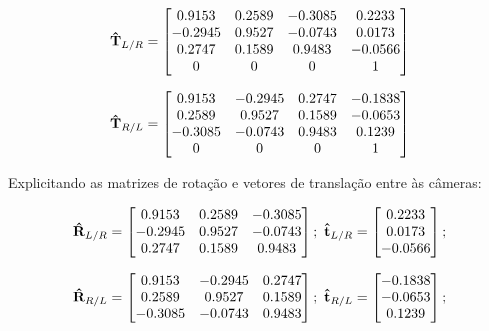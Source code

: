 \begin{equation}\label{eq:tfL2R}
	\mathbf{\hat{T}}_{L/R} = \begin{bmatrix}
		0.9153  & 0.2589 & -0.3085 & 0.2233  \\
		-0.2945 & 0.9527 & -0.0743 & 0.0173  \\
		0.2747  & 0.1589 & 0.9483  & -0.0566 \\
		0       & 0      & 0       & 1   
	\end{bmatrix}
\end{equation}

\begin{equation}\label{eq:tfR2L}
	\mathbf{\hat{T}}_{R/L} = \begin{bmatrix}
		0.9153  & -0.2945 & 0.2747 & -0.1838 \\
		0.2589  & 0.9527  & 0.1589 & -0.0653 \\
		-0.3085 & -0.0743 & 0.9483 & 0.1239  \\
		0       & 0       & 0      & 1
	\end{bmatrix}
\end{equation}

Explicitando as matrizes de rotação e vetores de translação entre às câmeras:

\begin{gather}
	\mathbf{\hat{R}}_{L/R} = \begin{bmatrix}
		0.9153  & 0.2589 & -0.3085 \\
		-0.2945 & 0.9527 & -0.0743 \\
		0.2747  & 0.1589 & 0.9483 
	\end{bmatrix}; \ \mathbf{\hat{t}}_{L/R} = \begin{bmatrix}
		0.2233 \\
		0.0173 \\
		-0.0566
	\end{bmatrix};
\end{gather}

\begin{gather}
\mathbf{\hat{R}}_{R/L} = \begin{bmatrix}
	0.9153  & -0.2945 & 0.2747 \\
	0.2589  & 0.9527  & 0.1589 \\
	-0.3085 & -0.0743 & 0.9483
\end{bmatrix}; \ \mathbf{\hat{t}}_{R/L} = \begin{bmatrix}
	-0.1838 \\
	-0.0653 \\
	0.1239
\end{bmatrix}; 
\end{gather}

